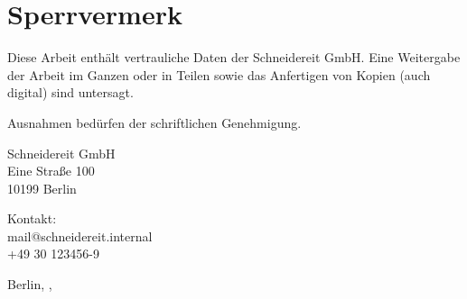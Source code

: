 \section*{Sperrvermerk}  \label{section:sperrvermerk}

Diese Arbeit enthält vertrauliche Daten der Schneidereit GmbH. Eine Weitergabe der Arbeit im Ganzen oder in Teilen sowie das Anfertigen von Kopien (auch digital) sind untersagt.

Ausnahmen bedürfen der schriftlichen Genehmigung. 

Schneidereit GmbH\\
Eine Straße 100\\
10199 Berlin

Kontakt:\\
mail@schneidereit.internal\\
+49 30 123456-9

Berlin, \thedate, \author{}